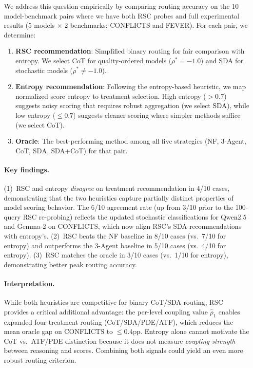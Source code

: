 \documentclass[11pt]{article}
\theoremstyle{definition}
\begin{document}
We address this question empirically by comparing routing accuracy
on the 10 model-benchmark pairs where we have both RSC probes
and full experimental results (5 models \(\times\) 2 benchmarks:
CONFLICTS and FEVER).
For each pair, we determine:

\begin{enumerate}[leftmargin=2em,itemsep=0pt]
\item \textbf{RSC recommendation}: Simplified binary routing for fair comparison with entropy. We select CoT for quality-ordered models
(\(\rho^* = -1.0\)) and SDA for stochastic models (\(\rho^* \neq -1.0\)).

\item \textbf{Entropy recommendation}: Following the entropy-based
heuristic, we map normalized score entropy to treatment selection.
High entropy (\(>0.7\)) suggests noisy scoring that requires
robust aggregation (we select SDA), while low entropy (\(\leq 0.7\))
suggests cleaner scoring where simpler methods suffice (we select CoT).

\item \textbf{Oracle}: The best-performing method among all five
strategies (NF, 3-Agent, CoT, SDA, SDA+CoT) for that pair.
\end{enumerate}

\paragraph{Key findings.}
(1)~RSC and entropy \emph{disagree} on treatment recommendation
in 4/10 cases, demonstrating that the two heuristics capture
partially distinct properties of model scoring behavior.
The 6/10 agreement rate (up from 3/10 prior to the 100-query
RSC re-probing) reflects the updated stochastic classifications
for Qwen2.5 and Gemma-2 on CONFLICTS, which now align RSC's
SDA recommendations with entropy's.
(2)~RSC beats the NF baseline in 8/10 cases (vs.\ 7/10 for entropy)
and outperforms the 3-Agent baseline in 5/10 cases (vs.\ 4/10 for entropy).
(3)~RSC matches the oracle in 3/10 cases (vs.\ 1/10 for entropy),
demonstrating better peak routing accuracy.

\paragraph{Interpretation.}
While both heuristics are competitive for binary CoT/SDA routing,
RSC provides a critical additional advantage:
the per-level coupling value \(\hat{\rho}_1\) enables expanded
four-treatment routing (CoT/SDA/PDE/ATF), which reduces the mean
oracle gap on CONFLICTS to \({\leq}\)0.4pp.
Entropy alone cannot motivate the CoT vs.\ ATF/PDE distinction
because it does not measure \emph{coupling strength} between
reasoning and scores.
Combining both signals could yield an even more robust routing criterion.
\end{document}
